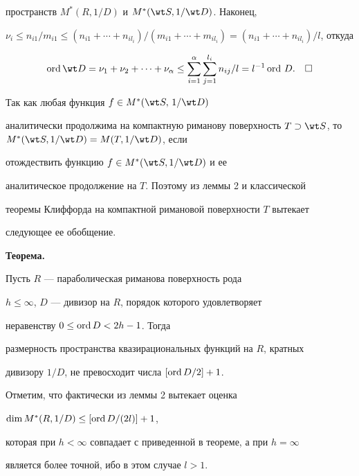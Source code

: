 пространств $M^*(R,1/D)$ и $M^*(\wt S,1/\wt D)$. Наконец,


$\nu_i\le n_{i1}/m_{i1}\le (n_{i1}+\dotsb +n_{il_i})/(m_{i1}+\dotsb


+m_{il_i})=(n_{i1}+\dotsb +n_{il_i})/l$, откуда


$$


\ord \wt D=\nu_1+\nu_2+\dotsb


+\nu_\alpha\le\sum^\alpha_{i=1}\sum^{l_i}_{j=1}n_{ij}/l=l^{-1}\ord\,D.


\quad\square


$$





Так как любая функция $f\in M^*(\wt S,\,1/\wt D)$


аналитически продолжима на компактную риманову поверхность $T\supset


\wt S$, то $M^*(\wt S,1/\wt D)=M(T,1/\wt D)$, если


отождествить функцию $f\in M^*(\wt S,1/\wt D)$ и ее


аналитическое продолжение на $T$. Поэтому из леммы 2 и классической


теоремы Клиффорда на компактной римановой поверхности $T$ вытекает


следующее ее обобщение.


\medskip





{\bf Теорема.} {\it


Пусть $R$ --- параболическая риманова поверхность рода


$h\le\infty$, $D$ --- дивизор на $R$, порядок которого удовлетворяет


неравенству $0\le\operatorname{ord} D<2h-1$. Тогда


размерность пространства квазирациональных функций на $R$, кратных


дивизору $1/D$, не превосходит числа $[\operatorname{ord} D/2]+1$.


}


\medskip





Отметим, что фактически из леммы 2 вытекает оценка


$\dim M^*(R, 1/D)\le [\operatorname{ord} D/(2l)]+1$,


которая при $h<\infty$ совпадает с приведенной в теореме, а при $h=\infty$


является более точной, ибо в этом случае $l>1$.





